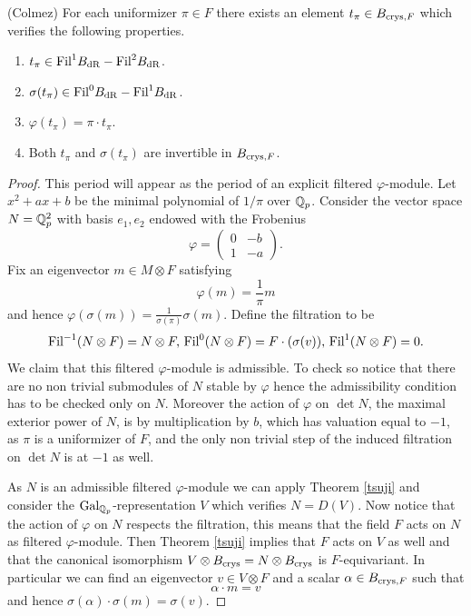 \documentclass[11pt]{amsart}
\begin{document}
\begin{prop}\label{lubintateram} (Colmez)
For each uniformizer $\pi \in F$ there exists an element $t_\pi \in B_{\textnormal{crys},F}$  which verifies the following properties.
\begin{enumerate}
\item $t_\pi \in \textnormal{Fil} ^{1} B_{\mathrm{dR}}-\textnormal{Fil} ^{2} B_{\mathrm{dR}}$.
\item $\sigma (t_\pi) \in \textnormal{Fil} ^{0} B_{\mathrm{dR}}-\textnormal{Fil} ^{1} B_{\mathrm{dR}}$.
\item  $ \varphi(t_\pi) = \pi  \cdot t_\pi$.
\item Both $t_\pi $ and  $ \sigma(t_\pi) $ are invertible in $B_{\textnormal{crys},F}$.
\end{enumerate}
\end{prop}
\begin{proof}
This period will appear as the period of an explicit filtered $\varphi$-module. Let $x^2+ax+b$ be the minimal polynomial of $1/\pi$ over $\mathbb{Q}_p$. Consider the vector space  $N=\mathbb{Q}_p^2$ with basis $e_1,e_2$ endowed with the Frobenius
\[ 
\varphi =  \begin{pmatrix} 0 & -b \\
1 & -a
 \end{pmatrix}.
 \]
 Fix an eigenvector $m \in M \otimes F$ satisfying
 \begin{equation}\label{disarli2}  
\varphi (m)=  \frac{1}{\pi} m
 \end{equation}
 and hence 
  $
\varphi (\sigma(m))=  \frac{1}{\sigma(\pi)} \sigma(m). 
 $
 Define the filtration to be \[\textnormal{Fil}^{-1} (N\otimes F)=N\otimes F, \, \textnormal{Fil}^0 (N\otimes F)= F\cdot ( \sigma(v)), \, \textnormal{Fil}^{1} (N\otimes F)=0.\] We claim that this filtered $\varphi$-module is admissible. To check so notice that there are no non trivial submodules of $N$ stable by $\varphi$ hence the admissibility condition has to be checked only on $N$. Moreover the action of $\varphi$ on $\det N$, the maximal exterior power of $N$, is by multiplication by $b$, which has valuation equal to $-1$, as $\pi$ is a uniformizer of $F$, and the only non trivial step of the induced filtration on $\det N$ is at $-1$ as well.
 
  As $N$ is an admissible filtered $\varphi$-module we can apply Theorem \ref{tsuji} and consider the $\textnormal{Gal}_{\mathbb{Q}_p}$-representation $V$ which verifies  $N=D(V)$. Now notice that the action of $\varphi$ on $N$ respects the filtration, this means that the field $F$ acts on $N$ as filtered $\varphi$-module. Then Theorem \ref{tsuji}  implies that
 $F$ acts on $V$ as well and that the canonical isomorphism  $V \otimes B_{\textnormal{crys}}= N \otimes B_{\textnormal{crys}}$ is $F$-equivariant. In particular we can find an eigenvector $v \in V \otimes F$ and a scalar $\alpha \in B_{\textnormal{crys},F}$ such that 
  \begin{equation}\label{disarli4}  
\alpha \cdot m=   v
 \end{equation}
 and hence $ \sigma(\alpha) \cdot \sigma(m)=   \sigma(v)$.
 

\end{proof}
\end{document}
